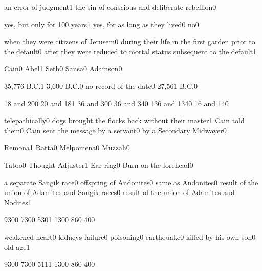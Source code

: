 
{an error of judgment}{1}
{the sin of conscious and deliberate rebellion}{0}
\qstop

{yes, but only for 100 years}{1}
{yes, for as long as they lived}{0}
{no}{0}
\qstop

{when they were citizens of Jerusem}{0}
{during their life in the first garden prior to the default}{0}
{after they were reduced to mortal status subsequent to the default}{1}
\qstop

{Cain}{0}
{Abel}{1}
{Seth}{0}
{Sansa}{0}
{Adamson}{0}
\qstop

{35,776 B.C.}{1}
{3,600 B.C.}{0}
{no record of the date}{0}
{27,561 B.C.}{0}
\qstop

{18 and 20}{0}
{20 and 18}{1}
{36 and 30}{0}
{36 and 34}{0}
{136 and 134}{0}
{16 and 14}{0}
\qstop

{telepathically}{0}
{dogs brought the flocks back without their master}{1}
{Cain told them}{0}
{Cain sent the message by a servant}{0}
{by a Secondary Midwayer}{0}
\qstop

{Remona}{1}
{Ratta}{0}
{Melpomena}{0}
{Muzzah}{0}
\qstop

{Tatoo}{0}
{Thought Adjuster}{1}
{Ear-ring}{0}
{Burn on the forehead}{0}
\qstop

{a separate Sangik race}{0}
{offspring of Andonites}{0}
{same as Andonites}{0}
{result of the union of Adamites and Sangik races}{0}
{result of the union of Adamites and Nodites}{1}
\qstop

{930}{0}
{730}{0}
{530}{1}
{130}{0}
{86}{0}
{40}{0}
\qstop

{weakened heart}{0}
{kidneys failure}{0}
{poisoning}{0}
{earthquake}{0}
{killed by his own son}{0}
{old age}{1}
\qstop

{930}{0}
{730}{0}
{511}{1}
{130}{0}
{86}{0}
{40}{0}
\qstop

